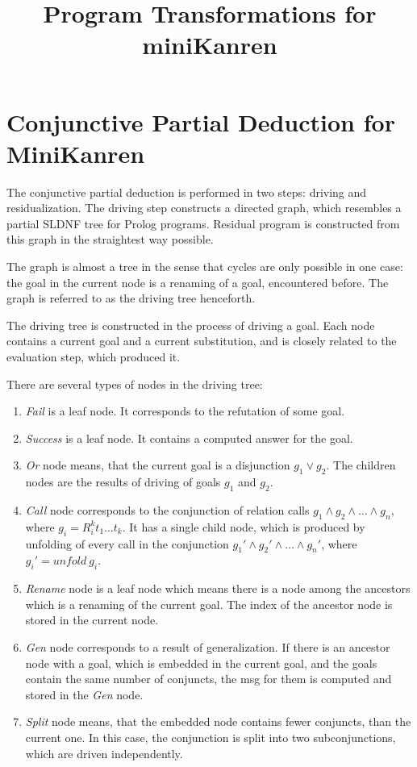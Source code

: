 \documentclass{llncs}
\begin{document}
\mainmatter

\title{Program Transformations for miniKanren}

\maketitle

\section{Conjunctive Partial Deduction for MiniKanren}

The conjunctive partial deduction is performed in two steps: driving and residualization. 
The driving step constructs a directed graph, which resembles a partial SLDNF tree for Prolog programs. Residual program is constructed from this graph in the straightest way possible.

The graph is almost a tree in the sense that cycles are only possible in one case: the goal in the current node is a renaming of a goal, encountered before. The graph is referred to as the driving tree henceforth.

The driving tree is constructed in the process of driving a goal. Each node contains a current goal and a current substitution, and is closely related to the evaluation step, which produced it. 

There are several types of nodes in the driving tree:

\begin{enumerate}
  \item \emph{Fail} is a leaf node. It corresponds to the refutation of some goal.
  \item \emph{Success} is a leaf node. It contains a computed answer for the goal.
  \item \emph{Or} node means, that the current goal is a disjunction $g_1 \vee   g_2$. The children nodes are the results of driving of goals $g_1$ and $g_2$. 
  \item \emph{Call} node corresponds to the conjunction of relation calls $g_1 \wedge g_2 \wedge \dots \wedge g_n$, where $g_i = R^k_i t_1 \dots t_k$. It has a single child node, which is produced by unfolding of every call in the conjunction $g_1' \wedge g_2' \wedge \dots \wedge g_n'$, where $g_i' = unfold \ g_i$.
  \item \emph{Rename} node is a leaf node which means there is a node among the ancestors which is a renaming of the current goal. The index of the ancestor node is stored in the current node. 
  \item \emph{Gen} node corresponds to a result of generalization. If there is an ancestor node with a goal, which is embedded in the current goal, and the goals contain the same number of conjuncts, the msg for them is computed and stored in the \emph{Gen} node. 
  \item \emph{Split} node means, that the embedded node contains fewer conjuncts, than the current one. In this case, the conjunction is split into two subconjunctions, which are driven independently. 
\end{enumerate}
\end{document}
